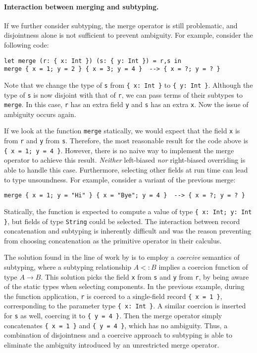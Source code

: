 \paragraph{Interaction between merging and subtyping.} \label{sec:merge}
If we further consider subtyping, the merge operator is still problematic, and
disjointness alone is not sufficient to prevent ambiguity. For example, consider
the following code:
\begin{lstlisting}
let merge (r: { x: Int }) (s: { y: Int }) = r,s in
merge { x = 1; y = 2 } { x = 3; y = 4 }  --> { x = ?; y = ? }
\end{lstlisting}
Note that we change the type of \lstinline{s} from \lstinline|{ x: Int }| to
\lstinline|{ y: Int }|. Although the type of \lstinline{s} is now disjoint with
that of \lstinline{r}, we can pass terms of their subtypes to \lstinline{merge}.
In this case, \lstinline{r} has an extra field \lstinline{y} and \lstinline{s}
has an extra \lstinline{x}. Now the issue of ambiguity occurs again.

If we look at the function \lstinline{merge} statically, we would expect that
the field \lstinline{x} is from \lstinline{r} and \lstinline{y} from
\lstinline{s}. Therefore, the most reasonable result for the code above is
\lstinline|{ x = 1; y = 4 }|. However, there is no naive way to implement the
merge operator to achieve this result. \emph{Neither} left-biased \emph{nor}
right-biased overriding is able to handle this case. Furthermore, selecting
other fields at run time can lead to type unsoundness. For example,
consider a variant of the previous merge:
\begin{lstlisting}
merge { x = 1; y = "Hi" } { x = "Bye"; y = 4 }  --> { x = ?; y = ? }
\end{lstlisting}
Statically, the function is expected to compute a value of type
\lstinline|{ x: Int; y: Int }|, but fields of type \lstinline{String} could be
selected. The interaction between record concatenation and subtyping is
inherently difficult and was the reason preventing
\citet{cardelli1991operations} from choosing concatenation as the primitive
operator in their calculus.

The solution found in the line of work by \citet{oliveira2016disjoint} is to
employ a \emph{coercive} semantics of subtyping, where a subtyping relationship
$A <: B$ implies a coercion function of type $A \to B$. This solution picks the
field \lstinline{x} from \lstinline{s} and \lstinline{y} from \lstinline{r}, by
being aware of the static types when selecting components. In the previous
example, during the function application, \lstinline{r} is coerced to a
single-field record \lstinline|{ x = 1 }|, corresponding to the parameter type
\lstinline|{ x: Int }|. A similar coercion is inserted for \lstinline{s} as
well, coercing it to \lstinline|{ y = 4 }|. Then the merge operator simply
concatenates \lstinline|{ x = 1 }| and \lstinline|{ y = 4 }|, which has no
ambiguity. Thus, a combination of disjointness and a coercive approach to
subtyping is able to eliminate the ambiguity introduced by an unrestricted merge
operator.

